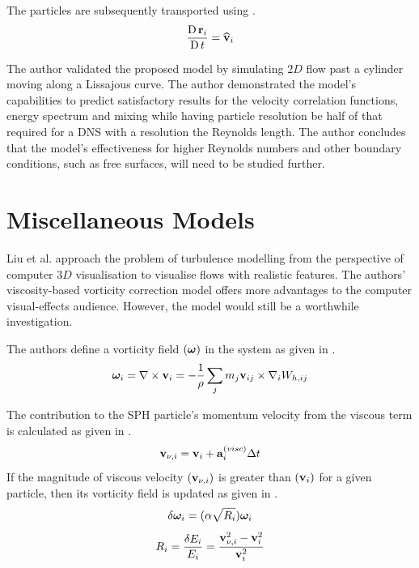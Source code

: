 The particles are subsequently transported using .
\begin{equation}
    \frac{\operatorname{D} \mathbf{r}_i}{\operatorname{D} t} = \widehat{\mathbf{v}}_i
    \label{eq:Monaghan2017-r-transport}
\end{equation}

The author validated the proposed model by simulating $2D$ flow past a cylinder moving along a Lissajous curve.
The author demonstrated the model’s capabilities to predict satisfactory results for the velocity correlation functions, energy spectrum and mixing while having particle resolution be half of that required for a DNS with a resolution the Reynolds length. The author concludes that the model’s effectiveness for higher Reynolds numbers and other boundary conditions, such as free surfaces, will need to be studied further.

\section{Miscellaneous Models}
Liu et al. \parencite{Liu2019} approach the problem of turbulence modelling from the perspective of computer $3D$ visualisation to visualise flows with realistic features. The authors’ viscosity-based vorticity correction model offers more advantages to the computer visual-effects audience. However, the model would still be a worthwhile investigation.

The authors define a vorticity field $(\bm{\omega})$ in the system as given in .
\begin{equation}
    \bm{\omega}_i = \nabla \times \mathbf{v}_i = - \frac{1}{\rho} \sum_j m_j \mathbf{v}_{ij} \times \nabla_{i} W_{h, ij}
    \label{eq:Liu2019-vorticity}
\end{equation}

The contribution to the SPH particle’s momentum velocity from the viscous term is calculated as given in .
\begin{equation}
    \mathbf{v}_{\nu, i} = \mathbf{v}_i + \mathbf{a}_i^{(visc)}\Delta t
    \label{eq:Liu2019-visc-vel-contribution}
\end{equation}
If the magnitude of viscous velocity $(\mathbf{v}_{\nu, i})$ is greater than $(\mathbf{v}_i)$ for a given particle, then its vorticity field is updated as given in .
\begin{equation}
    \delta \bm{\omega}_i = (\alpha \sqrt{R_i}) \bm{\omega}_i
    \label{eq:Liu2019-vorticity-update}
\end{equation}
\begin{equation}
    R_i = \frac{\delta E_i}{E_i} = \frac{\mathbf{v}_{\nu, i}^2 - \mathbf{v}_i^2}{\mathbf{v}_i^2}
    \label{eg:Liu2019-R}
\end{equation}

